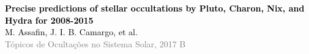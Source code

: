 

{ %
\begin{frame}[c]%
\begin{center}



	\quad

	
	\vspace{1em}
	\normalsize\textcolor{black}{\textbf{Precise predictions of stellar occultations by Pluto, Charon, Nix, and Hydra for 2008-2015}
	\texttt{}}\\
	\vspace{.5em}
	\quad
	\footnotesize\textcolor{black}{M. Assafin, J. I. B. Camargo, et al.} \\
	\vspace{1.5cm}
	\footnotesize\textcolor{gray}{Tópicos de Ocultações no Sistema Solar, 2017 B}\quad

\end{center}
\end{frame}
}


